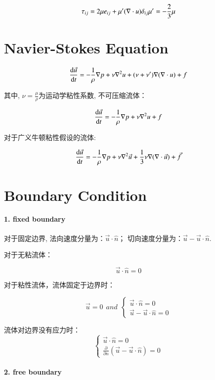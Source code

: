 \documentclass[fontset=windows]{report}
\begin{document}
\[\tau_{ij}=2\mu e_{ij}+\mu'(\nabla\cdot u)\delta_{ij} \\
\mu' = -\frac 2 3 \mu\]


\section{Navier-Stokes Equation}

\[\frac{{\rm d}\vec u}{{\rm d}t}=
-\frac{1}{\rho}\nabla p+
\nu\nabla^2 u+
(\nu+\nu')\nabla(\nabla\cdot u)+f\]

其中, \(\nu=\frac \mu \rho\)为运动学粘性系数, 不可压缩流体：

\[\frac{{\rm d}\vec u}{{\rm d}t}=
-\frac{1}{\rho}\nabla p+
\nu\nabla^2 u
+f \label{inNSE}\]

对于广义牛顿粘性假设的流体:

\[\frac{{\rm d}\vec u}{{\rm d}t}=
-\frac{1}{\rho}\nabla p+
\nu\nabla^2 \vec u+
\frac1 3\nu\nabla(\nabla\cdot \vec  u)+\vec f\]


\section{Boundary Condition}

\hypertarget{1-fixed-boundary}{%
\paragraph{1. fixed boundary}\label{1-fixed-boundary}}

对于固定边界, 法向速度分量为：\(\vec u\cdot\hat n\)；
切向速度分量为：\(\vec u-\vec u \cdot\hat n\).

对于无粘流体：

\[\vec u\cdot\hat n=0\]

对于粘性流体，流体固定于边界时：

\[\vec u =0 \ \ and \ \     
	\begin{cases}
        \vec u\cdot \hat n=0 \\
        \vec u-\vec u\cdot \hat n=0
    \end{cases}\]

流体对边界没有应力时：
\begin{equation}
  \begin{cases}
    \vec u\cdot \hat n=0 \\
    \frac{\partial}{\partial n}(\vec u-\vec u\cdot \hat n)=0
\end{cases}
\end{equation}


\hypertarget{2-free-boundary}{%
\paragraph{2. free boundary}\label{2-free-boundary}}
\end{document}
